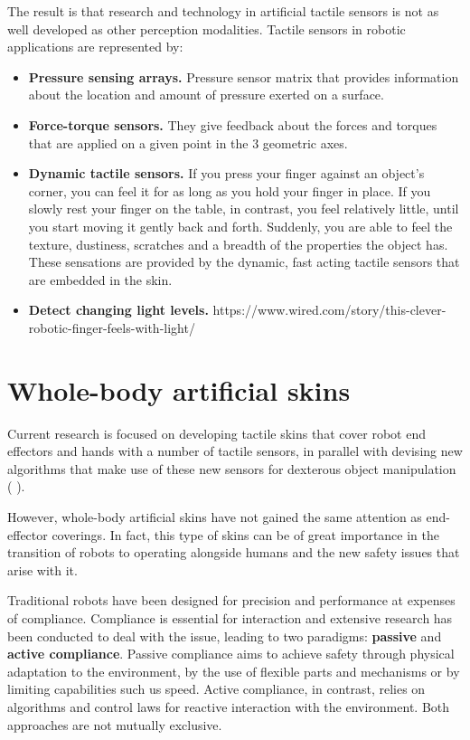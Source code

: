The result is that research and technology in artificial tactile sensors is not as well developed as other perception modalities. Tactile sensors in robotic applications are represented by:

\begin{itemize}
    \item\textbf{Pressure sensing arrays.} Pressure sensor matrix that provides information about the location and amount of pressure exerted on a surface.
    \item\textbf{Force-torque sensors.} They give feedback about the forces and torques that are applied on a given point in the 3 geometric axes.
\item\textbf{Dynamic tactile sensors.} If you press your finger against an object’s corner, you can feel it for as long as you hold your finger in place. If you slowly rest your finger on the table, in contrast, you feel relatively little, until you start moving it gently back and forth. Suddenly, you are able to feel the texture, dustiness, scratches and a breadth of the properties the object has. These sensations are provided by the dynamic, fast acting tactile sensors that are embedded in the skin.
    \item\textbf{Detect changing light levels.}  https://www.wired.com/story/this-clever-robotic-finger-feels-with-light/
\end{itemize}

\section{Whole-body artificial skins}
Current research is focused on developing tactile skins that cover robot end effectors and hands with a number of tactile sensors, in parallel with devising new algorithms that make use of these new sensors for dexterous object manipulation (\cite{tianFeel} \cite{wilson2020design}).

However, whole-body artificial skins have not gained the same attention as end-effector coverings. In fact, this type of skins can be of great importance in the transition of robots to operating alongside humans and the new safety issues that arise with it.

Traditional robots have been designed for precision and performance at expenses of compliance. Compliance is essential for interaction and extensive research has been conducted to deal with the issue, leading to two paradigms: \textbf{passive} and \textbf{active compliance}.  Passive compliance aims to achieve safety through physical adaptation to the environment, by the use of flexible parts and mechanisms or by limiting capabilities such us speed. Active compliance, in contrast, relies on algorithms and control laws for reactive interaction with the environment. Both approaches are not mutually exclusive.

